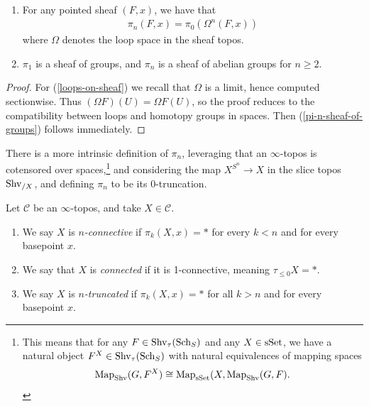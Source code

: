\documentclass[11pt,openany]{book}
\begin{document}
\begin{proposition}\label{prop:properties-of-pi-n-sheaf} \,
\begin{enumerate}
    \item\label{loops-on-sheaf}
    For any pointed sheaf $(F,x)$, we have that
    \begin{align*}
        \pi_n(F,x) = \pi_0(\Omega^n(F,x))
    \end{align*}
    where $\Omega$ denotes the loop space in the sheaf topos.
    \item\label{pi-n-sheaf-of-groups}
    $\pi_1$ is a sheaf of groups, and $\pi_n$ is a sheaf of abelian groups for $n\ge 2$.
\end{enumerate}
\end{proposition}
\begin{proof} For (\ref{loops-on-sheaf}) we recall that $\Omega$ is a limit, hence computed sectionwise. Thus $(\Omega F)(U) = \Omega F(U)$, so the proof reduces to the compatibility between loops and homotopy groups in spaces. Then (\ref{pi-n-sheaf-of-groups}) follows immediately.
\end{proof}

\begin{remark} There is a more intrinsic definition of $\pi_n$, leveraging that an $\infty$-topos is cotensored over spaces,\footnote{%
This means that for any $F \in \mathrm{Shv}_\tau(\mathrm{Sch}_S)$ and any $X \in \mathrm{sSet}$, we have a natural object $F^X\in \mathrm{Shv}_\tau(\mathrm{Sch}_S)$ with natural equivalences of mapping spaces
\begin{align*}
    \mathrm{Map}_{\mathrm{Shv}}(G,F^X) \cong \mathrm{Map}_{\mathrm{sSet}}(X,\mathrm{Map}_{\mathrm{Shv}}(G,F).
\end{align*}
}
and considering the map $X^{S^n} \to X$ in the slice topos $\mathrm{Shv}_{/X}$, and defining $\pi_n$ to be its 0-truncation.
\end{remark}

\begin{definition} \cite[6.5.1.10]{HTT} Let $\mathscr{C}$ be an $\infty$-topos, and take $X\in \mathscr{C}$.
\begin{enumerate}
    \item We say $X$ is $n$\textit{-connective} if $\pi_k(X,x) = \ast$ for every $k<n$ and for every basepoint $x$.
    \item We say that $X$ is \textit{connected} if it is 1-connective, meaning $\tau_{\le 0} X = \ast$.
    \item We say $X$ is $n$\textit{-truncated} if $\pi_k(X,x) = \ast$ for all $k>n$ and for every basepoint $x$.
\end{enumerate}
\end{definition}
\end{document}
